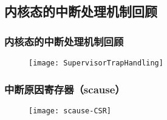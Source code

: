 \subsection{内核态的中断处理机制回顾} %


\begin{frame}
	\frametitle{内核态的中断处理机制回顾}
	\begin{figure}
	\texttt{[image: SupervisorTrapHandling]}
	\end{figure}
\end{frame}
%
%
%
%
%
%
%
%
%
\begin{frame}   
	\frametitle{中断原因寄存器（scause）}
	\begin{figure}
	\texttt{[image: scause-CSR]}
	\end{figure}
\end{frame}
%
